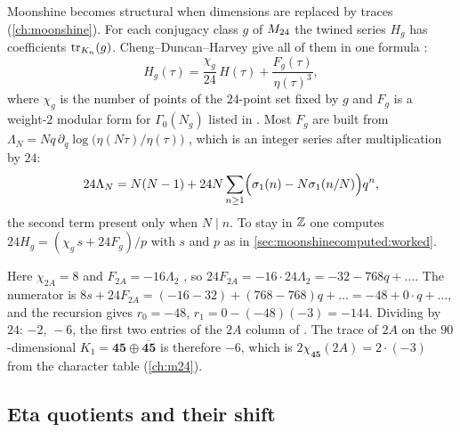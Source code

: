 Moonshine becomes structural when dimensions are replaced by traces
(\cref{ch:moonshine}). For each conjugacy class $g$ of $M_{24}$ the twined series $H_g$
has coefficients $\operatorname{tr}_{K_n}(g)$. Cheng--Duncan--Harvey give all of them in one formula
:
\begin{equation}\label{eq:moonshinecomputed:twined}
  H_g(\tau)=\frac{\chi_g}{24}\,H(\tau)+\frac{F_g(\tau)}{\eta(\tau)^3},
\end{equation}
where $\chi_g$ is the number of points of the $24$-point set fixed by $g$
 and $F_g$ is a weight-$2$ modular form for
$\Gamma_0(N_g)$ listed in . Most $F_g$ are built from
$\Lambda_N=Nq\,\partial_q\log\bigl(\eta(N\tau)/\eta(\tau)\bigr)$ , which is an integer series after multiplication by $24$:
\begin{equation}
  24\Lambda_N=N(N-1)+24N\sum_{n\ge1}\Bigl(\sigma_1(n)-N\sigma_1(n/N)\Bigr)q^n,
\end{equation}
the second term present only when $N\mid n$. To stay in $\mathbb{Z}$ one computes
$24H_g=(\chi_g\,s+24F_g)/p$ with $s$ and $p$ as in \cref{sec:moonshinecomputed:worked}.

\begin{example}
Here $\chi_{2A}=8$ and $F_{2A}=-16\Lambda_2$ , so
$24F_{2A}=-16\cdot24\Lambda_2=-32-768q+\dots$. The numerator is
$8s+24F_{2A}=(-16-32)+(768-768)q+\dots=-48+0\cdot q+\dots$, and the recursion gives
$r_0=-48$, $r_1=0-(-48)(-3)=-144$. Dividing by $24$: $-2,\,-6$, the first two entries of
the $2A$ column of . The trace of $2A$ on the
$90$-dimensional $K_1=\mathbf{45}\oplus\overline{\mathbf{45}}$ is therefore $-6$, which is
$2\chi_{\mathbf{45}}(2A)=2\cdot(-3)$ from the character table (\cref{ch:m24}).
\end{example}

\subsection{Eta quotients and their shift}\label{sec:moonshinecomputed:etaq}

